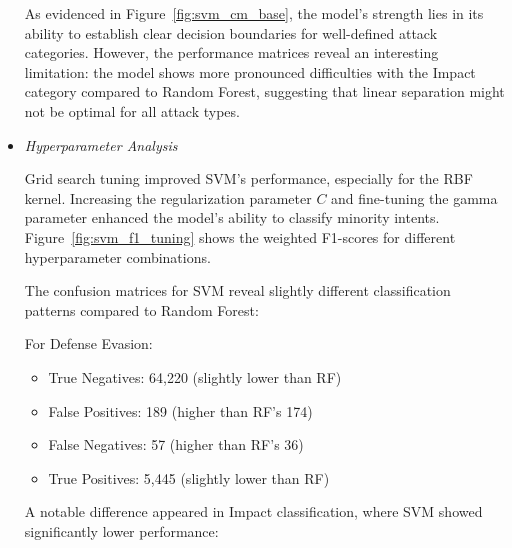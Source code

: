 \begin{itemize}
                    As evidenced in Figure~\ref{fig:svm_cm_base}, the model's strength lies in its ability to establish clear decision boundaries for well-defined attack categories. However, the performance matrices reveal an interesting limitation: the model shows more pronounced difficulties with the Impact category compared to Random Forest, suggesting that linear separation might not be optimal for all attack types.
                    

                \vspace{0.5em}

                \item \textit{Hyperparameter Analysis}
                
                    \vspace{0.3em}
                    

                    Grid search tuning improved SVM's performance, especially for the RBF kernel. Increasing the regularization parameter \( C \) and fine-tuning the gamma parameter enhanced the model's ability to classify minority intents. Figure~\ref{fig:svm_f1_tuning} shows the weighted F1-scores for different hyperparameter combinations.
                    
                    
                    The confusion matrices for SVM reveal slightly different classification patterns compared to Random Forest:
            
                    For Defense Evasion:
                    
                    \begin{itemize}
                        \item True Negatives: 64,220 (slightly lower than RF)
                        \item False Positives: 189 (higher than RF's 174)
                        \item False Negatives: 57 (higher than RF's 36)
                        \item True Positives: 5,445 (slightly lower than RF)
                    \end{itemize}

                    A notable difference appeared in Impact classification, where SVM showed significantly lower performance:
                    

\end{itemize}
